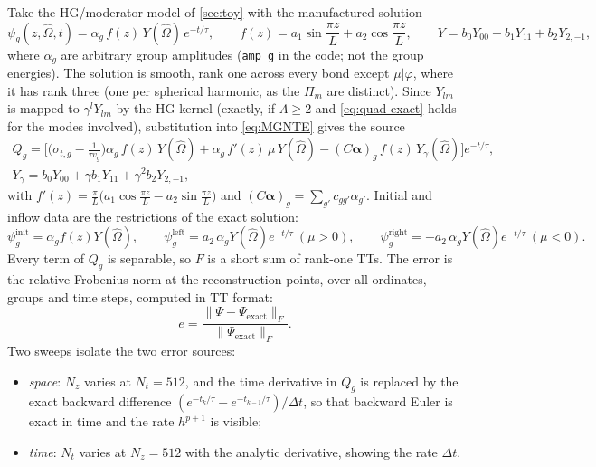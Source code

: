 \documentclass[11pt,a4paper]{article}
\numberwithin{equation}{section}
\theoremstyle{remark}
\newcommand{\Om}{\hat{\Omega}}
\newcommand{\Lmax}{\Lambda}
\begin{document}
Take the HG/moderator model of \cref{sec:toy} with the manufactured solution
\begin{equation}
\psi_g(z,\Om,t)=\alpha_g\,f(z)\,Y(\Om)\,e^{-t/\tau},\qquad
f(z)=a_1\sin\frac{\pi z}{L}+a_2\cos\frac{\pi z}{L},\qquad
Y=b_0Y_{00}+b_1Y_{11}+b_2Y_{2,-1},
\end{equation}
where $\alpha_g$ are arbitrary group amplitudes (\texttt{amp\_g} in the code; not the group energies). The solution is smooth, rank one across every bond except $\mu|\varphi$, where it has rank three (one per spherical harmonic, as the $\Pi_m$ are distinct). Since $Y_{lm}$ is mapped to $\gamma^lY_{lm}$ by the HG kernel (exactly, if $\Lmax\ge2$ and \eqref{eq:quad-exact} holds for the modes involved), substitution into \eqref{eq:MGNTE} gives the source
\begin{gather}
Q_g=\Big[\Big(\sigma_{t,g}-\frac{1}{\tau v_g}\Big)\alpha_g\,f(z)\,Y(\Om)
+\alpha_g\,f'(z)\,\mu\,Y(\Om)
-(C\bm\alpha)_g\,f(z)\,Y_\gamma(\Om)\Big]e^{-t/\tau},\\
Y_\gamma=b_0Y_{00}+\gamma b_1Y_{11}+\gamma^2b_2Y_{2,-1},
\end{gather}
with $f'(z)=\frac{\pi}{L}\big(a_1\cos\frac{\pi z}{L}-a_2\sin\frac{\pi z}{L}\big)$ and $(C\bm\alpha)_g=\sum_{g'}c_{gg'}\alpha_{g'}$. Initial and inflow data are the restrictions of the exact solution:
\begin{equation}
\psi^{\mathrm{init}}_g=\alpha_gf(z)Y(\Om),\qquad
\psi^{\mathrm{left}}_g=a_2\,\alpha_gY(\Om)e^{-t/\tau}\ (\mu>0),\qquad
\psi^{\mathrm{right}}_g=-a_2\,\alpha_gY(\Om)e^{-t/\tau}\ (\mu<0).
\end{equation}
Every term of $Q_g$ is separable, so $F$ is a short sum of rank-one TTs. The error is the relative Frobenius norm at the reconstruction points, over all ordinates, groups and time steps, computed in TT format:
\begin{equation}
e=\frac{\|\Psi-\Psi_{\mathrm{exact}}\|_F}{\|\Psi_{\mathrm{exact}}\|_F}.
\end{equation}
Two sweeps isolate the two error sources:
\begin{itemize}[nosep]
\item \emph{space}: $N_z$ varies at $N_t=512$, and the time derivative in $Q_g$ is replaced by the exact backward difference $(e^{-t_k/\tau}-e^{-t_{k-1}/\tau})/\Delta t$, so that backward Euler is exact in time and the rate $h^{p+1}$ is visible;
\item \emph{time}: $N_t$ varies at $N_z=512$ with the analytic derivative, showing the rate $\Delta t$.
\end{itemize}
\end{document}
